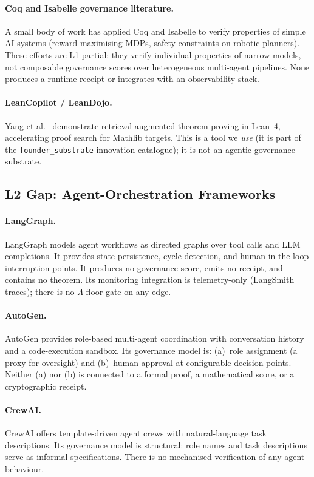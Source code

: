\paragraph{Coq and Isabelle governance literature.}
A small body of work has applied Coq and Isabelle to verify properties of
simple AI systems (reward-maximising MDPs, safety constraints on robotic
planners).
These efforts are L1-partial: they verify individual properties of
narrow models, not composable governance scores over heterogeneous
multi-agent pipelines.
None produces a runtime receipt or integrates with an observability stack.

\paragraph{LeanCopilot / LeanDojo.}
Yang et al.\ \cite{yang2024leandojo} demonstrate retrieval-augmented
theorem proving in Lean~4, accelerating proof search for Mathlib targets.
This is a tool we \emph{use} (it is part of the \texttt{founder\_substrate}
innovation catalogue); it is not an agentic governance substrate.

\subsection{L2 Gap: Agent-Orchestration Frameworks}
\label{ssec:l2gap}

\paragraph{LangGraph.}
LangGraph models agent workflows as directed graphs over tool calls and
LLM completions.
It provides state persistence, cycle detection, and human-in-the-loop
interruption points.
It produces no governance score, emits no receipt, and contains no theorem.
Its monitoring integration is telemetry-only (LangSmith traces); there is
no \(\Lambda\)-floor gate on any edge.

\paragraph{AutoGen.}
AutoGen provides role-based multi-agent coordination with conversation
history and a code-execution sandbox.
Its governance model is: (a)~role assignment (a proxy for oversight) and
(b)~human approval at configurable decision points.
Neither (a) nor (b) is connected to a formal proof, a mathematical
score, or a cryptographic receipt.

\paragraph{CrewAI.}
CrewAI offers template-driven agent crews with natural-language task
descriptions.
Its governance model is structural: role names and task descriptions
serve as informal specifications.
There is no mechanised verification of any agent behaviour.

